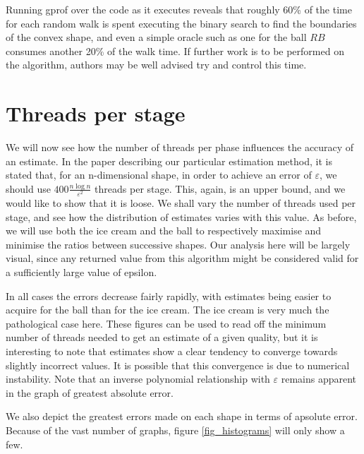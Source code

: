 Running gprof over the code as it executes reveals that roughly 60\% of the time for each random walk is spent executing the binary search to find the boundaries of the convex shape, and even a simple oracle such as one for the ball $RB$ consumes another 20\% of the walk time. If further work is to be performed on the algorithm, authors may be well advised try and control this time.

\section{Threads per stage}\label{sec_error}

We will now see how the number of threads per phase influences the accuracy of an estimate. In the paper describing our particular estimation method, it is stated that, for an n-dimensional shape, in order to achieve an error of $\varepsilon$, we should use $400\frac{n\log n}{\varepsilon^2}$ threads per stage. This, again, is an upper bound, and we would like to show that it is loose. We shall vary the number of threads used per stage, and see how the distribution of estimates varies with this value. As before, we will use both the ice cream and the ball to respectively maximise and minimise the ratios between successive shapes. Our analysis here will be largely visual, since any returned value from this algorithm might be considered valid for a sufficiently large value of epsilon.

In all cases the errors decrease fairly rapidly, with estimates being easier to acquire for the ball than for the ice cream. The ice cream is very much the pathological case here. These figures can be used to read off the minimum number of threads needed to get an estimate of a given quality, but it is interesting to note that estimates show a clear tendency to converge towards slightly incorrect values. It is possible that this convergence is due to numerical instability. Note that an inverse polynomial relationship with $\varepsilon$ remains apparent in the graph of greatest absolute error.

We also depict the greatest errors made on each shape in terms of apsolute error. Because of the vast number of graphs, figure \ref{fig_histograms} will only show a few.

